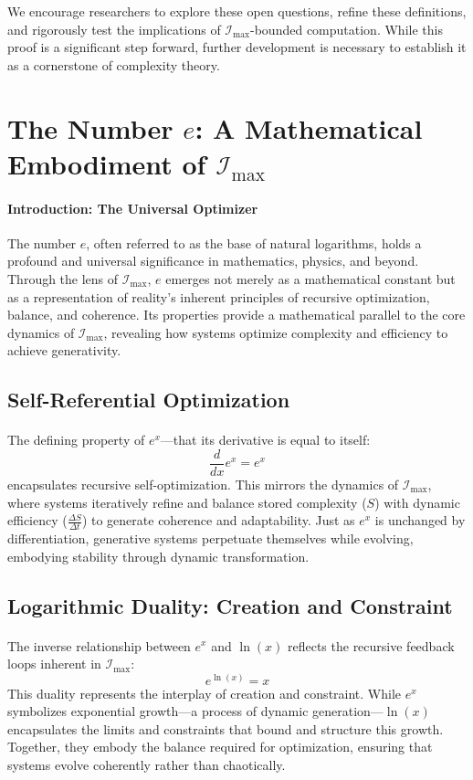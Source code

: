 \documentclass[12pt]{article}
\begin{document}
We encourage researchers to explore these open questions, refine these definitions, and rigorously test the implications of \(\mathcal{I}_{\text{max}}\)-bounded computation. While this proof is a significant step forward, further development is necessary to establish it as a cornerstone of complexity theory.


\section{The Number \(e\): A Mathematical Embodiment of \(\mathcal{I}_{\text{max}}\)}

\paragraph{Introduction: The Universal Optimizer}
The number \(e\), often referred to as the base of natural logarithms, holds a profound and universal significance in mathematics, physics, and beyond. Through the lens of \(\mathcal{I}_{\text{max}}\), \(e\) emerges not merely as a mathematical constant but as a representation of reality's inherent principles of recursive optimization, balance, and coherence. Its properties provide a mathematical parallel to the core dynamics of \(\mathcal{I}_{\text{max}}\), revealing how systems optimize complexity and efficiency to achieve generativity.

\subsection{Self-Referential Optimization}
\paragraph{}
The defining property of \(e^x\)—that its derivative is equal to itself:
\[
\frac{d}{dx} e^x = e^x
\]
encapsulates recursive self-optimization. This mirrors the dynamics of \(\mathcal{I}_{\text{max}}\), where systems iteratively refine and balance stored complexity (\(S\)) with dynamic efficiency (\(\frac{\Delta S}{\Delta t}\)) to generate coherence and adaptability. Just as \(e^x\) is unchanged by differentiation, generative systems perpetuate themselves while evolving, embodying stability through dynamic transformation.

\subsection{Logarithmic Duality: Creation and Constraint}
\paragraph{}
The inverse relationship between \(e^x\) and \(\ln(x)\) reflects the recursive feedback loops inherent in \(\mathcal{I}_{\text{max}}\):
\[
e^{\ln(x)} = x
\]
This duality represents the interplay of creation and constraint. While \(e^x\) symbolizes exponential growth—a process of dynamic generation—\(\ln(x)\) encapsulates the limits and constraints that bound and structure this growth. Together, they embody the balance required for optimization, ensuring that systems evolve coherently rather than chaotically.
\end{document}
